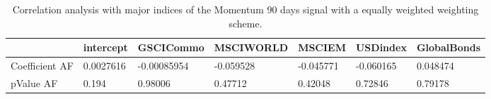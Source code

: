\begin{table}[H]
\centering
\begin{tabular}{lllllll}
& intercept & GSCICommo & MSCIWORLD & MSCIEM & USDindex & GlobalBonds \\ 
\hline 
Coefficient AF & 0.0027616 & -0.00085954 & -0.059528 & -0.045771 & -0.060165 & 0.048474 \\ 
pValue AF & 0.194 & 0.98006 & 0.47712 & 0.42048 & 0.72846 & 0.79178 \\ 
\hline
\end{tabular}
\caption{Correlation analysis with major indices of the Momentum 90 days signal with a equally weighted weighting scheme.}
\label{MOM90EW_AFACTOR}
\end{table}